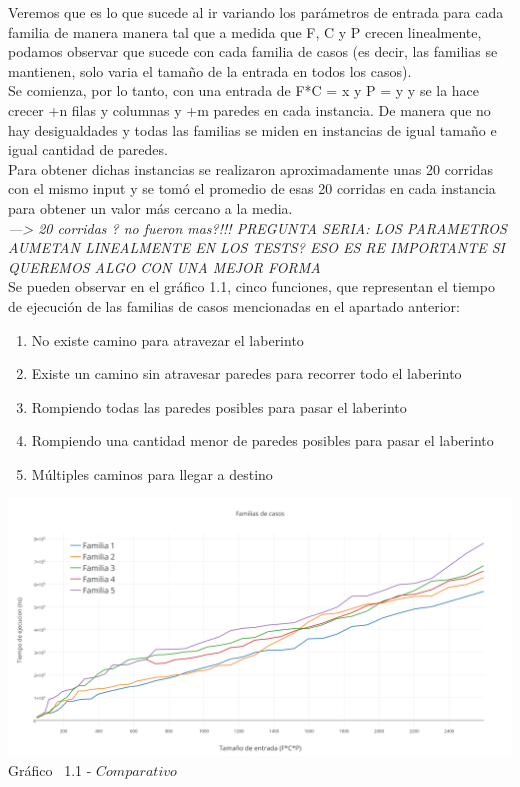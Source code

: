\indent Veremos que es lo que sucede al ir variando los parámetros de entrada para cada familia de manera manera tal que a medida que F, C y P crecen linealmente, podamos observar que sucede con cada familia de casos (es decir, las familias se mantienen, solo varia el tamaño de la entrada en todos los casos).\\
Se comienza, por lo tanto, con una entrada de F*C = x y P = y y se la hace crecer +n filas y columnas y +m paredes en cada instancia. De manera que no hay desigualdades y todas las familias se miden en instancias de igual tamaño e igual cantidad de paredes.\\

Para obtener dichas instancias se realizaron aproximadamente unas 20 corridas con el mismo input y se tom\'o el promedio de esas 20 corridas en cada instancia para obtener un valor m\'as cercano a la media.\\ 

\textit{---> 20 corridas ? no fueron mas?!!! PREGUNTA SERIA: LOS PARAMETROS AUMETAN LINEALMENTE EN LOS TESTS? ESO ES RE IMPORTANTE SI QUEREMOS ALGO CON UNA MEJOR FORMA}\\

Se pueden observar en el  gráfico 1.1, cinco funciones, que representan el tiempo de ejecuci\'on de las familias de casos mencionadas en el apartado anterior:\\

\begin{enumerate}
\item No existe camino para atravezar el laberinto
\item Existe un camino sin atravesar paredes para recorrer todo el laberinto
\item Rompiendo todas las paredes posibles para pasar el laberinto
\item Rompiendo una cantidad menor de paredes posibles para pasar el laberinto
\item Múltiples caminos para llegar a destino
\end{enumerate}

\vspace*{0.3cm} \vspace*{0.3cm}
  \begin{center}
 \includegraphics[scale=0.5]{./EJ1/comparativo.png}
 {Gr\'afico \ 1.1 - $Comparativo$}
  \end{center}
  \vspace*{0.3cm}
  
